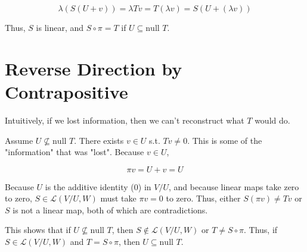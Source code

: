 \documentclass[letterpaper]{article}
\begin{document}
\[ \lambda\left(S(U+v)\right) = \lambda Tv = T(\lambda v) = S(U+(\lambda v)) \]

Thus, \(S\) is linear, and \(S \circ \pi = T\) if \(U \subseteq \text{null }T\).

\section{Reverse Direction by Contrapositive}
\label{sec:org71cd9b6}
Intuitively, if we lost information, then we can't reconstruct what \(T\) would do.

Assume \(U \nsubseteq \text{null }T\). There exists \(v \in U\) s.t. \(Tv \neq 0\). This is some of the "information" that was "lost". Because \(v \in U\),

\[ \pi v = U + v = U \]

Because \(U\) is the additive identity (\(0\)) in \(V/U\), and because linear maps take zero to zero, \(S \in \mathcal L(V/U, W)\) must take \(\pi v = 0\) to zero.
Thus, either \(S(\pi v) \neq Tv\) or \(S\) is not a linear map, both of which are contradictions.

This shows that if \(U \nsubseteq \text{null }T\), then \(S \notin \mathcal L(V/U, W)\) or \(T \neq S \circ \pi\). Thus, if \(S \in \mathcal L(V/U, W)\) and \(T = S \circ \pi\), then \(U \subseteq \text{null }T\).
\end{document}
